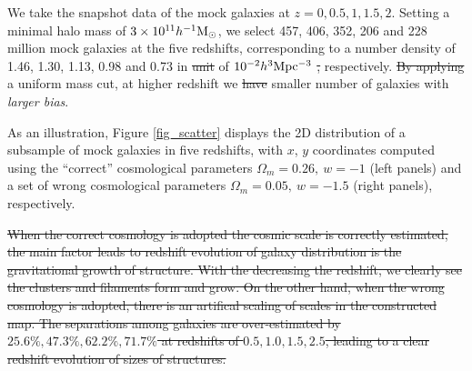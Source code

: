 \documentclass[iop]{emulateapj}
\newcommand{\hMsun}{{\ifmmode{h^{-1}{\rm
        {M_{\odot}}}}\else{$h^{-1}{\rm{M_{\odot}}}$~}\fi}}
\newcommand{\scr}{\textcolor{red}} %
\providecommand{\DIFadd}[1]{{\protect\color{blue}\uwave{#1}}} %
\providecommand{\DIFdel}[1]{{\protect\color{red}\sout{#1}}}                      %
\providecommand{\DIFaddbegin}{} %
\providecommand{\DIFaddend}{} %
\providecommand{\DIFdelbegin}{} %
\providecommand{\DIFdelend}{} %
\begin{document}
We take the snapshot data of the mock galaxies at $z=0,0.5,1,1.5,2$.
Setting a minimal halo mass of $3\times 10^{11} \hMsun$, 
we select 457, 406, 352, 206 and 228 million mock galaxies at the five redshifts,
corresponding to a number density of 
1.46, 1.30, 1.13, 0.98 and 0.73 in \DIFdelbegin \DIFdel{unit }\DIFdelend \DIFaddbegin \DIFadd{units }\DIFaddend of $ 10^{-2} h^{3} \rm Mpc^{-3}$
\DIFdelbegin \DIFdel{,
}\DIFdelend %
respectively.
\DIFdelbegin \DIFdel{By applying }\DIFdelend \DIFaddbegin \DIFadd{Applying }\DIFaddend a uniform mass cut, at higher redshift we \DIFdelbegin \DIFdel{have }\DIFdelend \DIFaddbegin \DIFadd{obtained a }\DIFaddend smaller number of galaxies with {\it larger bias}.

As an illustration, Figure \ref{fig_scatter} displays the 2D distribution of a subsample of mock galaxies in five redshifts,
with $x$, $y$ coordinates computed using the ``correct'' cosmological parameters $\Omega_m=0.26,\ w=-1$ (left panels) 
and a set of wrong cosmological parameters $\Omega_m=0.05,\ w=-1.5$ (right panels), respectively.

\DIFdelbegin \DIFdel{When the correct cosmology is adopted the cosmic scale is correctly estimated,
the main factor leads to redshift evolution of galaxy distribution is the gravitational growth of structure.
With the decreasing the redshift, we clearly see the clusters and filaments form and grow.
On the other hand, when the wrong cosmology is adopted, there is an artifical scaling of scales in the constructed map.
The separations among galaxies are over-estimated by 
$25.6\%,47.3\%,62.2\%,71.7\%$ at redshifts of $0.5,1.0,1.5,2.5$,
leading to a clear redshift evolution of sizes of structures.
}\DIFdelend \DIFaddbegin \DIFadd{\scr{When the correct cosmology is adopted the cosmic scale is correctly estimated,
the main factor leads to redshift evolution of galaxy distribution is the gravitational growth of structure.
With decreasing redshift, we clearly see the clusters and filaments form and grow.
On the other hand, when the wrong cosmology is adopted, there is an artificial scaling of distances in the constructed map.
The separations among galaxies are over-estimated by 
$25.6\%,47.3\%,62.2\%,71.7\%$ at redshifts of $0.5,1.0,1.5,2.5$,
leading to a clear redshift evolution of sizes of structures.}
}\DIFaddend 
\end{document}
